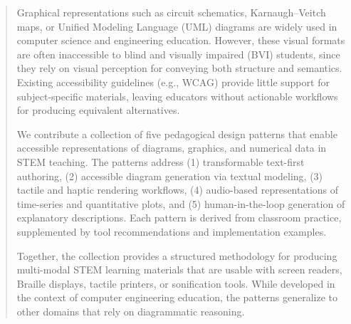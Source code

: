 \begin{abstract}
Graphical representations such as circuit schematics, Karnaugh--Veitch maps, or Unified Modeling Language (UML) diagrams are widely used in computer science and engineering education. However, these visual formats are often inaccessible to blind and visually impaired (BVI) students, since they rely on visual perception for conveying both structure and semantics. Existing accessibility guidelines (e.g., WCAG) provide little support for subject-specific materials, leaving educators without actionable workflows for producing equivalent alternatives.

We contribute a collection of five pedagogical design patterns that enable accessible representations of diagrams, graphics, and numerical data in STEM teaching. The patterns address (1) transformable text-first authoring, (2) accessible diagram generation via textual modeling, (3) tactile and haptic rendering workflows, (4) audio-based representations of time-series and quantitative plots, and (5) human-in-the-loop generation of explanatory descriptions. Each pattern is derived from classroom practice, supplemented by tool recommendations and implementation examples.

Together, the collection provides a structured methodology for producing multi-modal STEM learning materials that are usable with screen readers, Braille displays, tactile printers, or sonification tools. While developed in the context of computer engineering education, the patterns generalize to other domains that rely on diagrammatic reasoning. 

\end{abstract}

